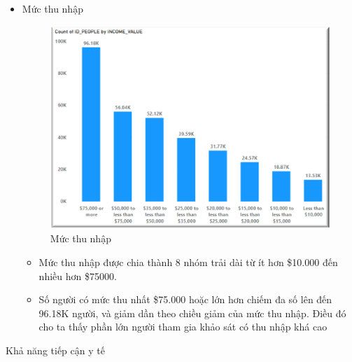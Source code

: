 \begin{itemize}[label=$-$]
\begin{itemize}[label=$+$]
\end{itemize}
\item Mức thu nhập
\begin{center}
            \begin{figure}[!h]
                \centering
                \includegraphics[scale = 0.7]{figures/Hoa/DE1.5.png} 
              \caption{Mức thu nhập }
            \end{figure}
\end{center}
\begin{itemize}[label=$+$]
\item Mức thu nhập được chia thành 8 nhóm trải dài từ ít hơn \$10.000 đến nhiều hơn \$75000.
\item Số người có mức thu nhất \$75.000 hoặc lớn hơn chiếm đa số lên đến 96.18K người, và giảm dần theo chiều giảm của mức thu nhập. Điều đó cho ta thấy phần lớn người tham gia khảo sát có thu nhập khá cao 
\end{itemize}
\end{itemize}
Khả năng tiếp cận y tế
